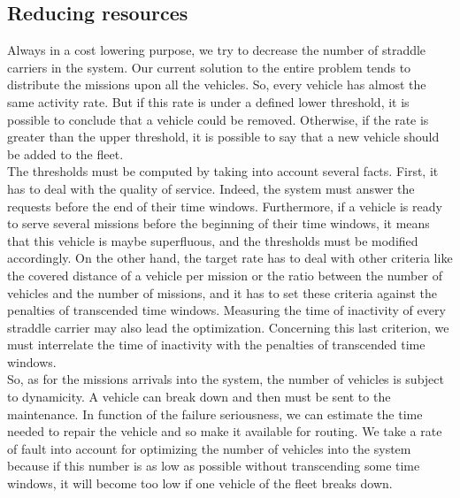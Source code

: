 \documentclass[journal]{IEEEtran}
\begin{document}
\subsection{Reducing resources}
Always in a cost lowering purpose, we try to decrease the number of straddle
carriers in the system. Our current solution to the entire problem tends to
distribute the missions upon all the vehicles. So, every vehicle has almost the
same activity rate. But if this rate is under a defined lower threshold, it is possible
to conclude that a vehicle could be removed. Otherwise, if the rate is greater
than the upper threshold, it is possible to say that a new vehicle should be added to the
fleet.\\

The thresholds must be computed by taking into account several facts. First, it
has to deal with the quality of service. Indeed, the system must answer the
requests before the end of their time windows. Furthermore, if a vehicle is ready
to serve several missions before the beginning of their time windows, it means
that this vehicle is maybe superfluous, and the thresholds must be
modified accordingly. On the other hand, the target rate has to deal with other criteria like
the covered distance of a vehicle per mission or the ratio between the number of
vehicles and the number of missions, and it has to set these criteria against
the penalties of transcended time windows. Measuring the time of inactivity of
every straddle carrier may also lead the optimization. Concerning this last
criterion, we must interrelate the time of inactivity with the penalties of
transcended time windows.\\

So, as for the missions arrivals into the system, the number of vehicles is
subject to dynamicity. A vehicle can break down and then must be sent to the
maintenance. In function of the failure seriousness, we can estimate the time
needed to repair the vehicle and so make it available for routing. We take a
rate of fault into account for optimizing the number of vehicles into the system
because if this number is as low as possible without transcending some time
windows, it will become too low if one vehicle of the fleet breaks down.
\end{document}

